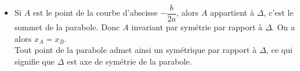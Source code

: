 \documentclass[10pt]{article}
\begin{document}
{\begin{itemize}
    \item Si $A$ est le point de la courbe d'abscisse $-\dfrac{b}{2a}$, alors $A$ appartient à $\Delta$, c'est le sommet de la parabole.
          Donc $A$ invariant par symétrie par rapport à $\Delta$. On a alors $x_A=x_B$. \\
          Tout point de la parabole admet ainsi un symétrique par rapport à $\Delta$, ce qui signifie que $\Delta$ est axe de symétrie de la parabole.
  \end{itemize}
}
\end{document}
